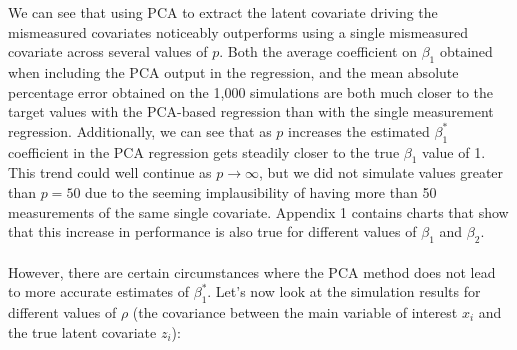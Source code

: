 \documentclass[12pt]{article}
\begin{document}
        We can see that using PCA to extract the latent covariate driving the mismeasured covariates noticeably outperforms using a single mismeasured covariate across several values of $p$. Both the average coefficient on $\beta_1$ obtained when including the PCA output in the regression, and the mean absolute percentage error obtained on the 1,000 simulations are both much closer to the target values with the PCA-based regression than with the single measurement regression. Additionally, we can see that as $p$ increases the estimated $\beta_1^*$ coefficient in the PCA regression gets steadily closer to the true $\beta_1$ value of 1. This trend could well continue as $p \to \infty$, but we did not simulate values greater than $p = 50$ due to the seeming implausibility of having more than 50 measurements of the same single covariate. Appendix 1 contains charts that show that this increase in performance is also true for different values of $\beta_1$ and $\beta_2$.\\
\\
        However, there are certain circumstances where the PCA method does not lead to more accurate estimates of $\beta_1^*$. Let's now look at the simulation results for different values of $\rho$ (the covariance between the main variable of interest $x_i$ and the true latent covariate $z_i$):

        
\end{document}
